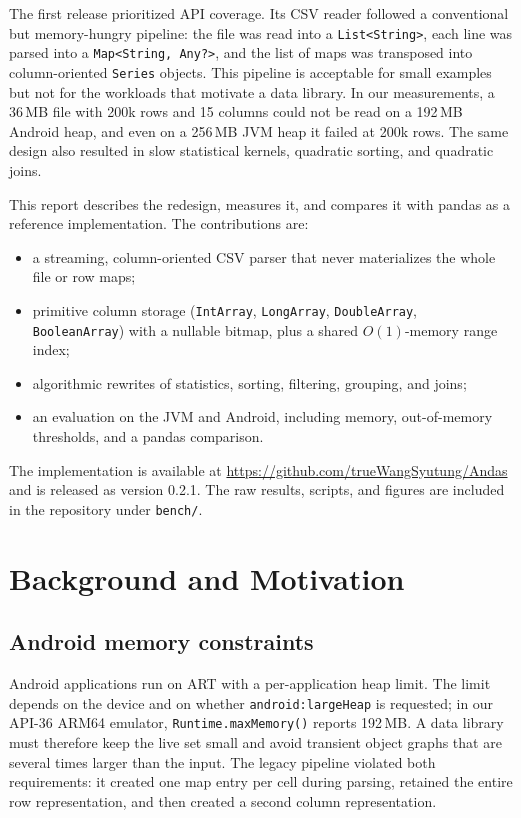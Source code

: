 \documentclass[11pt,a4paper]{article}
\newcommand{\code}[1]{\texttt{#1}}
\begin{document}
The first release prioritized API coverage.  Its CSV reader followed a conventional but
memory-hungry pipeline: the file was read into a \code{List<String>}, each line was parsed into
a \code{Map<String, Any?>}, and the list of maps was transposed into column-oriented
\code{Series} objects.  This pipeline is acceptable for small examples but not for the workloads
that motivate a data library.  In our measurements, a 36\,MB file with 200k rows and 15 columns
could not be read on a 192\,MB Android heap, and even on a 256\,MB JVM heap it failed at 200k rows.
The same design also resulted in slow statistical kernels, quadratic sorting, and quadratic joins.

This report describes the redesign, measures it, and compares it with pandas as a reference
implementation.  The contributions are:
\begin{itemize}
  \item a streaming, column-oriented CSV parser that never materializes the whole file or row maps;
  \item primitive column storage (\code{IntArray}, \code{LongArray}, \code{DoubleArray},
        \code{BooleanArray}) with a nullable bitmap, plus a shared $O(1)$-memory range index;
  \item algorithmic rewrites of statistics, sorting, filtering, grouping, and joins;
  \item an evaluation on the JVM and Android, including memory, out-of-memory thresholds,
        and a pandas comparison.
\end{itemize}

The implementation is available at \url{https://github.com/trueWangSyutung/Andas} and is released
as version 0.2.1.  The raw results, scripts, and figures are included in the repository under
\code{bench/}.

\section{Background and Motivation}

\subsection{Android memory constraints}

Android applications run on ART with a per-application heap limit.  The limit depends on the device
and on whether \code{android:largeHeap} is requested; in our API-36 ARM64 emulator,
\code{Runtime.maxMemory()} reports 192\,MB.  A data library must therefore keep the live set small
and avoid transient object graphs that are several times larger than the input.  The legacy
pipeline violated both requirements: it created one map entry per cell during parsing, retained the
entire row representation, and then created a second column representation.
\end{document}
